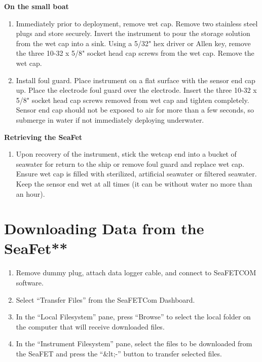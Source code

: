 \documentclass[]{book}
\providecommand{\tightlist}{%
  \setlength{\itemsep}{0pt}\setlength{\parskip}{0pt}}
\begin{document}
\textbf{On the small boat}

\begin{enumerate}
\def\labelenumi{\arabic{enumi}.}
\tightlist
\item
  Immediately prior to deployment, remove wet cap. Remove two stainless
  steel plugs and store securely. Invert the instrument to pour the
  storage solution from the wet cap into a sink. Using a 5/32" hex
  driver or Allen key, remove the three 10-32 x 5/8" socket head cap
  screws from the wet cap. Remove the wet cap.
\item
  Install foul guard. Place instrument on a flat surface with the sensor
  end cap up. Place the electrode foul guard over the electrode. Insert
  the three 10-32 x 5/8" socket head cap screws removed from wet cap and
  tighten completely. Sensor end cap should not be exposed to air for
  more than a few seconds, so submerge in water if not immediately
  deploying underwater.
\end{enumerate}

\textbf{Retrieving the SeaFet}

\begin{enumerate}
\def\labelenumi{\arabic{enumi}.}
\tightlist
\item
  Upon recovery of the instrument, stick the wetcap end into a bucket of
  seawater for return to the ship or remove foul guard and replace wet
  cap. Ensure wet cap is filled with sterilized, artificial seawater or
  filtered seawater. Keep the sensor end wet at all times (it can be
  without water no more than an hour).
\end{enumerate}

\section{Downloading Data from the
SeaFet**}\label{downloading-data-from-the-seafet}

\begin{enumerate}
\def\labelenumi{\arabic{enumi}.}
\setcounter{enumi}{1}
\item
  Remove dummy plug, attach data logger cable, and connect to SeaFETCOM
  software.
\item
  Select ``Transfer Files'' from the SeaFETCom Dashboard.
\item
  In the ``Local Filesystem'' pane, press ``Browse'' to select the local
  folder on the computer that will receive downloaded files.
\item
  In the ``Instrument Filesystem'' pane, select the files to be
  downloaded from the SeaFET and press the ``\&lt;-'' button to transfer
  selected files.
\end{enumerate}
\end{document}
